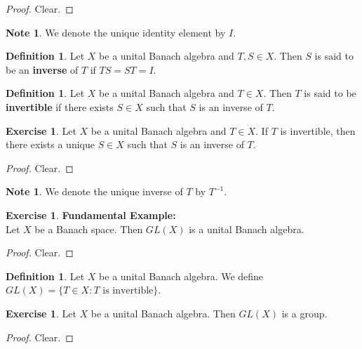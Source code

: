 \documentclass[12pt]{amsart}
\theoremstyle{definition}
\newtheorem{defn}[definition]{Definition}
\newtheorem{note}[definition]{Note}
\newtheorem{ex}[definition]{Exercise}
\newcommand{\lex}[1]{\label{ex:#1}}
\newcommand{\ld}[1]{\label{defn:#1}}
\begin{document}
		\begin{proof}
		Clear.
		\end{proof}
		
		\begin{note}
		We denote the unique identity element by $I$.
		\end{note}
		
		\begin{defn} \ld{}
		Let $X$ be a unital Banach algebra and $T,S \in X$. Then $S$ is said to be an 
		\textbf{inverse} of $T$ if $TS=ST = I$.
		\end{defn}

		\begin{defn} \ld{}
		Let $X$ be a unital Banach algebra and $T \in X$. 			Then $T$ is said to be 
		\textbf{invertible} if there exists $S \in X$ such 		that $S$ is an inverse of $T$.
		\end{defn}
		
		\begin{ex} \lex{}
		Let $X$ be a unital Banach algebra and $T \in X$. If $T$ is invertible, then there exists a unique $S \in X$ such that $S$ is an inverse of $T$.
		\end{ex}
		
		\begin{proof}
		Clear.
		\end{proof}
		
		\begin{note}
		We denote the unique inverse of $T$ by $T^{-1}$.
		\end{note}
		
			
	\begin{ex} \lex{}\textbf{Fundamental Example:} \\
	Let $X$ be a Banach space. Then $GL(X)$ is a unital Banach algebra.
	\end{ex}
	
	\begin{proof}
	Clear.
	\end{proof}
		
		\begin{defn} \ld{}
		Let $X$ be a unital Banach algebra. We define $GL(X) = \{T \in X: T \text{ is invertible}\}$.
		\end{defn}
		
		\begin{ex} \lex{}
		Let $X$ be a unital Banach algebra. Then $GL(X)$ is a group.  
	\end{ex}
	
	\begin{proof}
	Clear.
	\end{proof}
	
\end{document}
